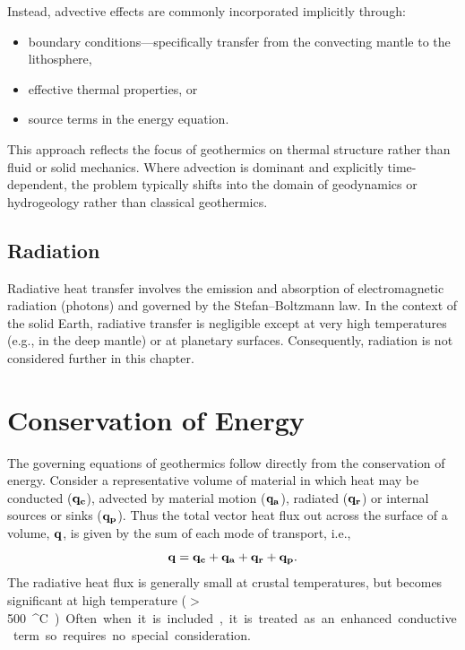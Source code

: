 Instead, advective effects are commonly incorporated implicitly through:
\begin{itemize}
    \item boundary conditions---specifically transfer from the convecting mantle to the lithosphere,
    \item effective thermal properties, or
    \item source terms in the energy equation.
\end{itemize}
This approach reflects the focus of geothermics on thermal structure rather than fluid or solid mechanics. Where advection is dominant and explicitly time-dependent, the problem typically shifts into the domain of geodynamics or hydrogeology rather than classical geothermics.

\subsection{Radiation}
Radiative heat transfer involves the emission and absorption of electromagnetic radiation (photons) and governed by the Stefan--Boltzmann law. In the context of the solid Earth, radiative transfer is negligible except at very high temperatures (e.g., in the deep mantle) or at planetary surfaces. Consequently, radiation is not considered further in this chapter.


\section{Conservation of Energy}

The governing equations of geothermics follow directly from the conservation of energy. Consider a representative volume of material in which heat may be conducted ($\vb{q_c}$), advected by material motion ($\vb{q_a}$), radiated ($\vb{q_r}$) or internal sources or sinks ($\vb{q_p}$).  Thus the total vector heat flux out across the surface of a volume, $\vb{q}$, is given by the sum of each mode of transport, i.e.,
\begin{equation}
    \vb{q} = \vb{q_c} + \vb{q_a} + \vb{q_r} + \vb{q_p}.
\end{equation}
The radiative heat flux is generally small at crustal temperatures, but becomes significant at high temperature ($>$\SI{500}{^\circ C}). Often when it is included, it is treated as an enhanced conductive term so requires no special consideration.

